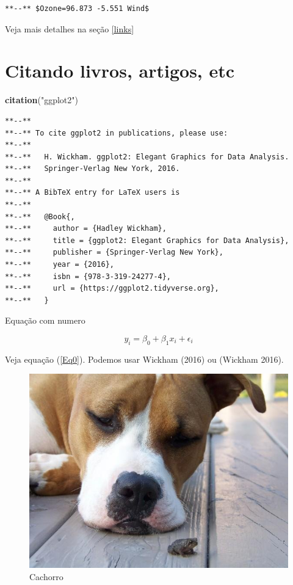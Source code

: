\documentclass[12pt,brazil,]{article}
\newenvironment{Shaded}{\begin{snugshade}}{\end{snugshade}}
\newcommand{\KeywordTok}[1]{\textcolor[rgb]{0.13,0.29,0.53}{\textbf{#1}}}
\newcommand{\NormalTok}[1]{#1}
\newcommand{\StringTok}[1]{\textcolor[rgb]{0.31,0.60,0.02}{#1}}
\begin{document}
\begin{verbatim}
**--** $Ozone=96.873 -5.551 Wind$
\end{verbatim}

Veja mais detalhes na seção \ref{links}

\hypertarget{citando-livros-artigos-etc}{%
\section{Citando livros, artigos,
etc}\label{citando-livros-artigos-etc}}

\begin{Shaded}
\begin{Highlighting}[]
\KeywordTok{citation}\NormalTok{(}\StringTok{"ggplot2"}\NormalTok{)}
\end{Highlighting}
\end{Shaded}

\begin{verbatim}
**--** 
**--** To cite ggplot2 in publications, please use:
**--** 
**--**   H. Wickham. ggplot2: Elegant Graphics for Data Analysis.
**--**   Springer-Verlag New York, 2016.
**--** 
**--** A BibTeX entry for LaTeX users is
**--** 
**--**   @Book{,
**--**     author = {Hadley Wickham},
**--**     title = {ggplot2: Elegant Graphics for Data Analysis},
**--**     publisher = {Springer-Verlag New York},
**--**     year = {2016},
**--**     isbn = {978-3-319-24277-4},
**--**     url = {https://ggplot2.tidyverse.org},
**--**   }
\end{verbatim}

Equação com numero

\begin{equation}
y_i=\beta_0 + \beta_1 x_i + \epsilon_i \label{Eq0}
\end{equation}

Veja equação (\ref{Eq0}). Podemos usar Wickham (2016) ou (Wickham 2016).

\begin{figure}

{\centering \includegraphics[width=0.5\linewidth]{cachorro} 

}

\caption{Cachorro}\label{fig:unnamed-chunk-11}
\end{figure}
\end{document}
